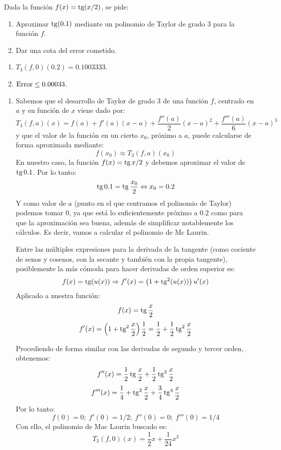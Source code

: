 {Dada la función $f(x)=\operatorname{tg}(x/2)$, se pide:
\begin{enumerate}
\item Aproximar $\operatorname{tg}(0.1)$ mediante un polinomio de Taylor de grado 3 para la función $f$.
\item Dar una cota del error cometido.
\end{enumerate}
}
{
\begin{enumerate}
\item $T_3 (f,0)(0.2) = 0.1003333$.
\item ${\rm Error} \le 0.00033$.
\end{enumerate}
}
{\begin{enumerate}
\item Sabemos que el desarrollo de Taylor de grado 3 de una función
$f$,  centrado en $a$ y en función de $x$ viene dado por:
\[
T_3 (f,a)(x) = f(a) + f'(a)(x - a) + \frac{{f''(a)}}{2}(x - a)^2  +
\frac{{f'''(a)}}{6}(x - a)^3
\]
y que el valor de la función en un cierto $x_0$, próximo a $a$,
puede calcularse de forma aproximada mediante:
\[
f(x_0 ) \approx T_3 (f,a)(x_0 )
\]
En nuestro caso, la función $f(x)= \operatorname{tg} x/2$ y debemos aproximar el
valor de $\operatorname{tg} 0.1$. Por lo tanto:
\[
\operatorname{tg} 0.1 = \operatorname{tg} \frac{{x_0 }}{2} \Leftrightarrow x_0  = 0.2
\]
Y como valor de $a$ (punto en el que centramos el polinomio de
Taylor) podemos tomar 0, ya que está lo suficientemente próximo a
$0.2$ como para que la aproximación sea buena, además de simplificar
notablemente los cálculos. Es decir, vamos a calcular el polinomio
de Mc Laurin.

Entre las múltiples expresiones para la derivada de la tangente
(como cociente de senos y cosenos, con la secante y también con la
propia tangente), posiblemente la más cómoda para hacer derivadas de
orden superior es:
\[
f(x) = \operatorname{tg} (u(x)) \Rightarrow f'(x) = \left( {1 + \operatorname{tg} ^2 (u(x))}
\right)u'(x)
\]
Aplicado a nuestra función:
\[
f(x) = \operatorname{tg} \frac{x}{2}
\]
\[
f'(x) = \left( {1 + \operatorname{tg} ^2 \frac{x}{2}} \right)\frac{1}{2} =
\frac{1}{2} + \frac{1}{2}\operatorname{tg} ^2 \frac{x}{2}
\]

Procediendo de forma similar con las derivadas de segundo y tercer
orden, obtenemos:
\[
f''(x) = \frac{1}{2}\operatorname{tg} \frac{x}{2} + \frac{1}{2}\operatorname{tg} ^3
\frac{x}{2}
\]
\[
f'''(x) = \frac{1}{4} + \operatorname{tg} ^2 \frac{x}{2} + \frac{3}{4}\operatorname{tg} ^4
\frac{x}{2}
\]
Por lo tanto:
\[
f(0) = 0;\;f'(0) = 1/2;\;f''(0) = 0;\;f'''(0) = 1/4
\]
Con ello, el polinomio de Mac Laurin buscado es:
\[
T_3 (f,0)(x) = \frac{1}{2}x + \frac{1}{{24}}x^3
\]


\end{enumerate}}
